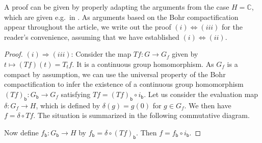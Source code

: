 \documentclass[11pt, a4wide]{amsart}
\numberwithin{lemma}{section}
\begin{document}
\begin{appendix}
A proof can be given by properly adapting the arguments from the case $H=\mathbb C$, which are given e.g.~in \cite{MoSt}. As arguments based on the Bohr compactification appear throughout the article, we write out the proof $(i) \Leftrightarrow (iii)$ for the reader's convenience, assuming that we have established $(i) \Leftrightarrow (ii)$.

\begin{proof}
\noindent  $(i) \Rightarrow (iii)$: Consider the map $Tf:G\to G_f$ given by $t\mapsto (Tf)(t)=T_tf$. It is a continuous group homomorphism. As
$G_f$ is a compact by assumption, we can use the universal property of the Bohr compactification to infer the existence of a continuous group homomorphism $(Tf)_\mathsf{b}: G_\mathsf{b}\to G_f$ satisfying $Tf=(Tf)_\mathsf{b}\circ i_\mathsf{b}$. Let us consider the evaluation map $\delta: G_f\to H$, which is defined by $\delta(g)=g(0)$ for $g\in G_f$. We then have $f=\delta\circ Tf$. The situation is summarized in the following commutative diagram.
%
\begin{center}
\end{center}
%
Now define $f_\mathsf{b}: G_\mathsf{b}\to H$ by $f_\mathsf{b}=\delta\circ (Tf)_\mathsf{b}$. Then $f=f_\mathsf{b}\circ i_\mathsf{b}$.

\smallskip


\end{proof}
\end{appendix}
\end{document}
